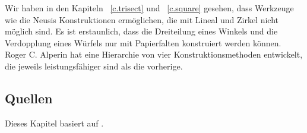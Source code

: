 Wir haben in den Kapiteln ~\ref{c.trisect} und ~\ref{c.square} gesehen, dass Werkzeuge wie die Neusis Konstruktionen ermöglichen, die mit Lineal und Zirkel nicht möglich sind. Es ist erstaunlich, dass die Dreiteilung eines Winkels und die Verdopplung eines Würfels nur mit Papierfalten konstruiert werden können. Roger C. Alperin hat eine Hierarchie von vier Konstruktionsmethoden entwickelt, die jeweils leistungsfähiger sind als die vorherige.

\subsection*{Quellen}

Dieses Kapitel basiert auf \cite{alperin,lang,martin,newton}.
